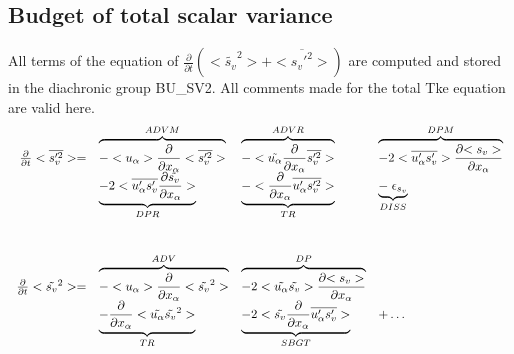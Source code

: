 \subsection{Budget of total scalar variance}


All terms of the equation of $\frac{\partial}{\partial t} (<\tilde{s_v}^2> + <\overline{s_v'^2}>)$ are
computed and stored in the diachronic group BU\_SV2. 
All comments made for the total Tke equation are valid here.\\

\begin{displaymath}
\left.
\begin{array}{rllll}
\frac{\partial }{\partial t} <\overline{s_v'^2}> = & 
\overbrace{- <u_\alpha>\frac{\partial}{\partial x_\alpha} <\overline{s_v'^2}> }^{ADVM}  &
\overbrace{- <\tilde{u_\alpha}\frac{\partial}{\partial x_\alpha} \overline{s_v'^2} > }^{ADVR} &
\overbrace{- 2 <\overline{u_\alpha's_v'}> \frac{\partial {<s_v>}}{\partial x_\alpha} }^{DPM} \\
\vspace*{1.0cm}
& \underbrace{- 2 <\overline{u'_\alpha s_v'} \frac{\partial {\tilde{s_v}}}{\partial x_\alpha}>}_{DPR}  &
 \underbrace{- <\frac{\partial}{\partial x_\alpha} \overline{u'_\alpha s_v'^2}>}_{TR}
 & \underbrace{-\; \epsilon_{s_v}}_{DISS}\\
\frac{\partial }{\partial t} <\tilde{s_v}^2> = & 
\overbrace{- <u_\alpha>\frac{\partial}{\partial x_\alpha} <\tilde{s_v}^2> }^{ADV} &
\overbrace{- 2<\tilde{u_\alpha} \tilde{s_v}> \frac{\partial {<s_v>}}{\partial x_\alpha}}^{DP} &\\
& \underbrace{- \frac{\partial}{\partial x_\alpha} <\tilde{u_\alpha} \tilde{s_v}^2>}_{TR} &
\underbrace{- 2 <\tilde{s_v}\frac{\partial}{\partial x_\alpha}\overline{u'_\alpha s_v'}>}_{SBGT} & + \ldots
\end{array}
\right.
\end{displaymath}

